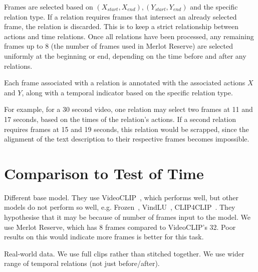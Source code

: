 Frames are selected based on $(X_{start}, X_{end}), (Y_{start}, Y_{end})$ and
the specific relation type. If a relation requires frames that intersect an
already selected frame, the relation is discarded. This is to keep a strict
relationship between actions and time relations. Once all relations have been
processed, any remaining frames up to 8 (the number of frames used in Merlot
Reserve) are selected uniformly at the beginning or end, depending on the time
before and after any relations. %

Each frame associated with a relation is annotated with the associated actions
$X$ and $Y$, along with a temporal indicator based on the specific relation
type.

For example, for a 30 second video, one relation may select two frames
at 11 and 17 seconds, based on the times of the relation's actions. If a second
relation requires frames at 15 and 19 seconds, this relation would be scrapped,
since the alignment of the text description to their respective frames becomes
impossible.


\section{Comparison to Test of Time}
\label{sec:tactcompare}

Different base model. They use VideoCLIP~\citep{xu2021videoclip}, which performs well,
but other models do not perform so well, e.g. Frozen~\citep{bain2021frozen}, 
VindLU~\citep{cheng2023vindlu}, CLIP4CLIP~\citep{luo2022clip4clip}. They hypothesise
that it may be because of number of frames input to the model. We use Merlot Reserve,
which has 8 frames compared to VideoCLIP's 32. Poor results on this would indicate
more frames is better for this task.

Real-world data. We use full clips rather than stitched together. We use wider range
of temporal relations (not just before/after).

